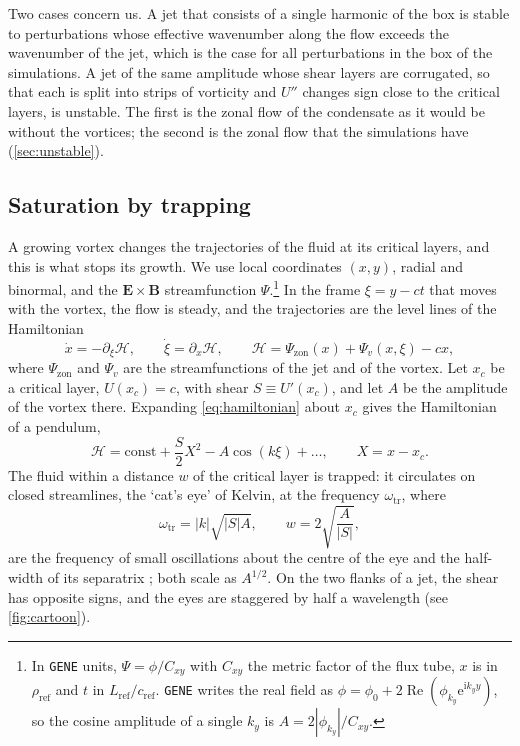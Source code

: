 \documentclass{jpp}
\renewcommand{\vec}[1]{\boldsymbol{#1}}
\newcommand{\vec}[1]{\boldsymbol{#1}}
\newcommand{\vE}{\vec{E}}
\newcommand{\vB}{\vec{B}}
\newcommand{\exb}{\(\vE\times\vB\)}
\newcommand{\gene}{\texttt{GENE}}
\newcommand{\rme}{\text{e}}
\newcommand{\rmi}{\text{i}}
\newcommand{\zon}{\text{zon}}
\newcommand{\omtr}{\omega_\text{tr}}
\newcommand{\Ham}{\mathcal{H}}
\newcommand{\Cxy}{C_{xy}}
\begin{document}
Two cases concern us. A jet that consists of a single harmonic of the box is stable to perturbations whose effective wavenumber along the flow exceeds the wavenumber of the jet, which is the case for all perturbations in the box of the simulations. A jet of the same amplitude whose shear layers are corrugated, so that each is split into strips of vorticity and \(U''\) changes sign close to the critical layers, is unstable. The first is the zonal flow of the condensate as it would be without the vortices; the second is the zonal flow that the simulations have (\cref{sec:unstable}).

\subsection{Saturation by trapping}\label{sec:pendulum}

A growing vortex changes the trajectories of the fluid at its critical layers, and this is what stops its growth. We use local coordinates \((x, y)\), radial and binormal, and the \exb{} streamfunction \(\Psi\).\footnote{In \gene{} units, \(\Psi = \phi/\Cxy\) with \(\Cxy\) the metric factor of the flux tube, \(x\) is in \(\rho_\text{ref}\) and \(t\) in \(L_\text{ref}/c_\text{ref}\). \gene{} writes the real field as \(\phi = \phi_0 + 2\operatorname{Re}(\phi_{k_y}\rme^{\rmi k_yy})\), so the cosine amplitude of a single \(k_y\) is \(A = 2|\phi_{k_y}|/\Cxy\).} In the frame \(\xi = y - ct\) that moves with the vortex, the flow is steady, and the trajectories are the level lines of the Hamiltonian
\begin{equation}
\dot x = -\partial_\xi\Ham,
\qquad
\dot\xi = \partial_x\Ham,
\qquad
\Ham = \Psi_\zon(x) + \Psi_v(x,\xi) - cx,
\label{eq:hamiltonian}
\end{equation}
where \(\Psi_\zon\) and \(\Psi_v\) are the streamfunctions of the jet and of the vortex. Let \(x_c\) be a critical layer, \(U(x_c) = c\), with shear \(S \equiv U'(x_c)\), and let \(A\) be the amplitude of the vortex there. Expanding \cref{eq:hamiltonian} about \(x_c\) gives the Hamiltonian of a pendulum,
\begin{equation}
\Ham = \text{const} + \frac{S}{2}X^2 - A\cos(k\xi) + \dots,
\qquad
X = x - x_c.
\label{eq:pendulum}
\end{equation}
The fluid within a distance \(w\) of the critical layer is trapped: it circulates on closed streamlines, the `cat's eye' of Kelvin, at the frequency \(\omtr\), where
\begin{equation}
\omtr = |k|\sqrt{|S|A},
\qquad
w = 2\sqrt{\frac{A}{|S|}},
\label{eq:trapping}
\end{equation}
are the frequency of small oscillations about the centre of the eye and the half-width of its separatrix \citep{ONeil1965}; both scale as \(A^{1/2}\). On the two flanks of a jet, the shear has opposite signs, and the eyes are staggered by half a wavelength (see \cref{fig:cartoon}).
\end{document}
